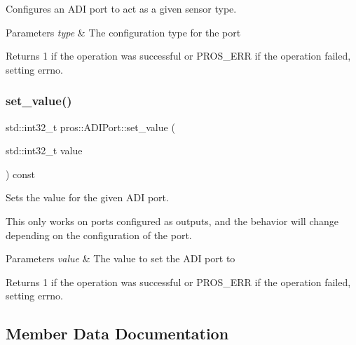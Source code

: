 Configures an A\+DI port to act as a given sensor type.


\begin{DoxyParams}{Parameters}
{\em type} & The configuration type for the port\\
\hline
\end{DoxyParams}
\begin{DoxyReturn}{Returns}
1 if the operation was successful or P\+R\+O\+S\+\_\+\+E\+RR if the operation failed, setting errno. 
\end{DoxyReturn}
\mbox{\label{classpros_1_1ADIPort_ae6711117fbceb3bb6e3602c4ef63aff1}} 
\subsubsection{\texorpdfstring{set\+\_\+value()}{set\_value()}}
{\footnotesize\ttfamily std\+::int32\+\_\+t pros\+::\+A\+D\+I\+Port\+::set\+\_\+value (\begin{DoxyParamCaption}\item[{std\+::int32\+\_\+t}]{value }\end{DoxyParamCaption}) const}

Sets the value for the given A\+DI port.

This only works on ports configured as outputs, and the behavior will change depending on the configuration of the port.


\begin{DoxyParams}{Parameters}
{\em value} & The value to set the A\+DI port to\\
\hline
\end{DoxyParams}
\begin{DoxyReturn}{Returns}
1 if the operation was successful or P\+R\+O\+S\+\_\+\+E\+RR if the operation failed, setting errno. 
\end{DoxyReturn}


\subsection{Member Data Documentation}
\mbox{\label{classpros_1_1ADIPort_a75f3b6c1ae3c1f6b755e18444e7559d6}} 
